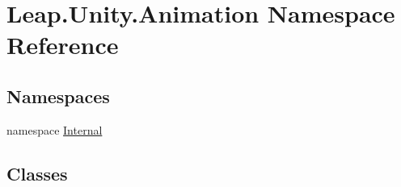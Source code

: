 \hypertarget{namespace_leap_1_1_unity_1_1_animation}{}\section{Leap.\+Unity.\+Animation Namespace Reference}
\label{namespace_leap_1_1_unity_1_1_animation}
\subsection*{Namespaces}
\begin{DoxyCompactItemize}
\item 
namespace \mbox{\hyperlink{namespace_leap_1_1_unity_1_1_animation_1_1_internal}{Internal}}
\end{DoxyCompactItemize}
\subsection*{Classes}
